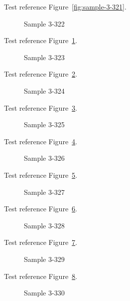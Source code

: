 Test reference Figure~\ref{fig:sample-3-321}.

\begin{figure}[tbhp]
\caption{Sample 3-322}
\label{fig:sample-3-322}
\end{figure}

Test reference Figure~\ref{fig:sample-3-322}.

\begin{figure}[tbhp]
\caption{Sample 3-323}
\label{fig:sample-3-323}
\end{figure}

Test reference Figure~\ref{fig:sample-3-323}.

\begin{figure}[tbhp]
\caption{Sample 3-324}
\label{fig:sample-3-324}
\end{figure}

Test reference Figure~\ref{fig:sample-3-324}.

\begin{figure}[tbhp]
\caption{Sample 3-325}
\label{fig:sample-3-325}
\end{figure}

Test reference Figure~\ref{fig:sample-3-325}.

\begin{figure}[tbhp]
\caption{Sample 3-326}
\label{fig:sample-3-326}
\end{figure}

Test reference Figure~\ref{fig:sample-3-326}.

\begin{figure}[tbhp]
\caption{Sample 3-327}
\label{fig:sample-3-327}
\end{figure}

Test reference Figure~\ref{fig:sample-3-327}.

\begin{figure}[tbhp]
\caption{Sample 3-328}
\label{fig:sample-3-328}
\end{figure}

Test reference Figure~\ref{fig:sample-3-328}.

\begin{figure}[tbhp]
\caption{Sample 3-329}
\label{fig:sample-3-329}
\end{figure}

Test reference Figure~\ref{fig:sample-3-329}.

\begin{figure}[tbhp]
\caption{Sample 3-330}
\label{fig:sample-3-330}
\end{figure}

